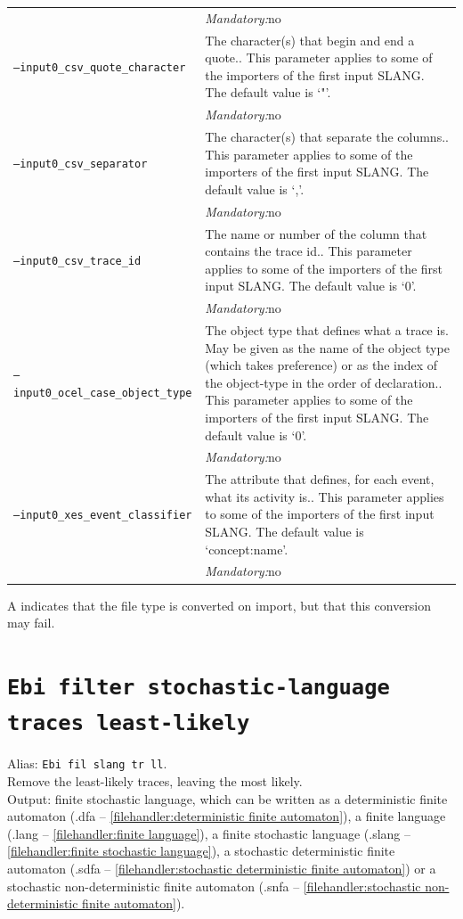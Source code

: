 {\begin{tabularx}{\linewidth}{lX}
&\textit{Mandatory:}\quad no\\
\texttt{--input0\_csv\_quote\_character} & The character(s) that begin and end a quote.. This parameter applies to some of the importers of the first input SLANG. The default value is `"'.\\
&\textit{Mandatory:}\quad no\\
\texttt{--input0\_csv\_separator} & The character(s) that separate the columns.. This parameter applies to some of the importers of the first input SLANG. The default value is `,'.\\
&\textit{Mandatory:}\quad no\\
\texttt{--input0\_csv\_trace\_id} & The name or number of the column that contains the trace id.. This parameter applies to some of the importers of the first input SLANG. The default value is `0'.\\
&\textit{Mandatory:}\quad no\\
\texttt{--input0\_ocel\_case\_object\_type} & The object type that defines what a trace is. May be given as the name of the object type (which takes preference) or as the index of the object-type in the order of declaration.. This parameter applies to some of the importers of the first input SLANG. The default value is `0'.\\
&\textit{Mandatory:}\quad no\\
\texttt{--input0\_xes\_event\_classifier} & The attribute that defines, for each event, what its activity is.. This parameter applies to some of the importers of the first input SLANG. The default value is `concept:name'.\\
&\textit{Mandatory:}\quad no\\
\bottomrule
\end{tabularx}
A \textdagger{} indicates that the file type is converted on import, but that this conversion may fail.
\clearpage\section{\texttt{Ebi filter stochastic-language traces least-likely}}
\label{command:Ebi filter stochastic-language traces least-likely}
Alias: \texttt{Ebi fil slang tr ll}.\\
Remove the least-likely traces, leaving the most likely.\\
\noindent Output: finite stochastic language, which can be written as a deterministic finite automaton (.dfa -- \cref{filehandler:deterministic finite automaton}), a finite language (.lang -- \cref{filehandler:finite language}), a finite stochastic language (.slang -- \cref{filehandler:finite stochastic language}), a stochastic deterministic finite automaton (.sdfa -- \cref{filehandler:stochastic deterministic finite automaton}) or a stochastic non-deterministic finite automaton (.snfa -- \cref{filehandler:stochastic non-deterministic finite automaton}).\\
}
